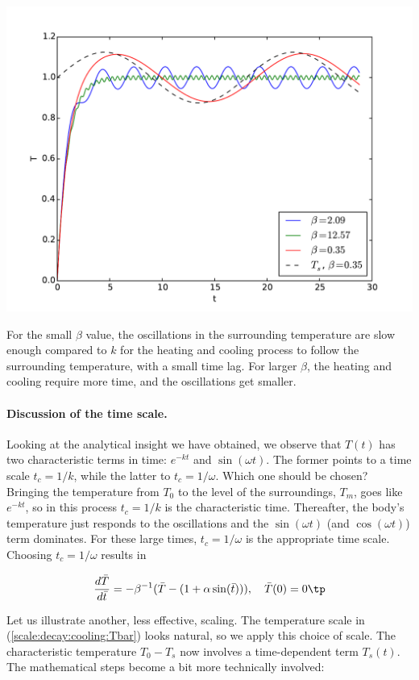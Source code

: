 \documentclass[graybox,envcountchap,sectrefs,final]{svmonodo}
\begin{document}
\centerline{\includegraphics[width=0.8\linewidth]{fig-scaling/osc_cooling.pdf}}



For the small $\beta$ value, the oscillations in the surrounding
temperature are slow enough compared to $k$ for the heating and
cooling process to follow the surrounding temperature, with a small
time lag. For larger $\beta$, the heating and cooling require more
time, and the oscillations get smaller.

\paragraph{Discussion of the time scale.}
Looking at the analytical insight we have obtained, we
observe that $T(t)$ has two characteristic
terms in time: $e^{-kt}$ and $\sin(\omega t)$. The former points to a time
scale $t_c=1/k$, while the latter to $t_c=1/\omega$.
Which one should be chosen? Bringing the temperature from $T_0$ to
the level of the surroundings, $T_m$, goes like $e^{-kt}$, so
in this process $t_c=1/k$ is the characteristic time. Thereafter,
the body's temperature just responds to the oscillations and the
$\sin (\omega t)$ (and $\cos(\omega t)$) term dominates. For these large times,
$t_c=1/\omega$ is the appropriate time scale. Choosing $t_c=1/\omega$
results in

\begin{equation}
\frac{d\bar T}{d\bar t} = -\beta^{-1}(\bar T - (1 + \alpha\sin (\bar t))),\quad
\bar T(0)=0\tp
\label{scale:decay:cooling:model:scaled2}
\end{equation}


Let us illustrate another, less effective, scaling.
The temperature scale in
(\ref{scale:decay:cooling:Tbar}) looks natural, so we apply this
choice of scale. The characteristic temperature $T_0-T_s$
now involves
a time-dependent term $T_s(t)$. The mathematical steps become a bit
more technically involved:
\end{document}
